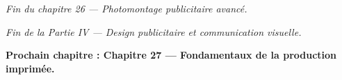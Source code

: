 \vspace{2em}

\begin{center}
\textit{Fin du chapitre 26 --- Photomontage publicitaire avancé.}

\vspace{1em}

\textit{Fin de la Partie IV --- Design publicitaire et communication visuelle.}

\vspace{1em}

\textbf{Prochain chapitre : Chapitre 27 --- Fondamentaux de la production imprimée.}
\end{center}